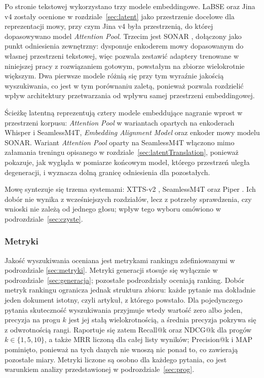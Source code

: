 Po stronie tekstowej wykorzystano trzy modele embeddingowe. LaBSE \cite{feng-etal-2022-language}
oraz Jina v4 \cite{jina_v4} zostały ocenione w rozdziale~\ref{sec:latent} jako przestrzenie
docelowe dla reprezentacji mowy, przy czym Jina v4 była przestrzenią, do której dopasowywano model
\textit{Attention Pool}. Trzecim jest SONAR \cite{sonar}, dołączony jako punkt odniesienia
zewnętrzny: dysponuje enkoderem mowy dopasowanym do własnej przestrzeni tekstowej, więc pozwala
zestawić adaptery trenowane w niniejszej pracy z rozwiązaniem gotowym, powstałym na zbiorze
wielokrotnie większym. Dwa pierwsze modele różnią się przy tym wyraźnie jakością
wyszukiwania, co jest w tym porównaniu zaletą, ponieważ pozwala rozdzielić wpływ architektury
przetwarzania od wpływu samej przestrzeni embeddingowej.

Ścieżkę latentną reprezentują cztery modele embeddujące nagranie wprost w przestrzeni korpusu:
\textit{Attention Pool} w wariantach opartych na enkoderach Whisper i SeamlessM4T,
\textit{Embedding Alignment Model} oraz enkoder mowy modelu SONAR. Wariant \textit{Attention Pool}
oparty na SeamlessM4T włączono mimo załamania treningu opisanego
w rozdziale~\ref{sec:latentTranslation}, ponieważ pokazuje, jak wygląda w pomiarze końcowym model,
którego przestrzeń uległa degeneracji, i wyznacza dolną granicę odniesienia dla pozostałych.

Mowę syntezuje się trzema systemami: XTTS-v2 \cite{xtts}, SeamlessM4T \cite{m4t} oraz Piper
\cite{vits}. Ich dobór nie wynika
z wcześniejszych rozdziałów, lecz z potrzeby sprawdzenia, czy wnioski nie zależą od jednego głosu;
wpływ tego wyboru omówiono w podrozdziale~\ref{sec:czyste}.

\subsubsection{Metryki}
Jakość wyszukiwania oceniana jest metrykami rankingu zdefiniowanymi w podrozdziale
\ref{sec:metryki}. Metryki generacji stosuje się wyłącznie w podrozdziale~\ref{sec:generacja};
pozostałe podrozdziały oceniają ranking. Dobór metryk rankingu ogranicza jednak struktura zbioru: każde pytanie ma dokładnie
jeden dokument istotny, czyli artykuł, z którego powstało. Dla pojedynczego pytania skuteczność
wyszukiwania przyjmuje wtedy wartość zero albo jeden, precyzja na progu $k$ jest jej stałą
wielokrotnością, a średnia precyzja pokrywa się z odwrotnością rangi. Raportuje się zatem Recall@k
oraz NDCG@k dla progów $k \in \{1,5,10\}$, a także MRR liczoną dla całej listy wyników; Precision@k
i MAP pominięto, ponieważ na tych danych nie wnoszą nic ponad to, co zawierają pozostałe miary.
Metryki liczone są osobno dla każdego pytania, co jest warunkiem analizy przedstawionej
w podrozdziale~\ref{sec:prog}.

